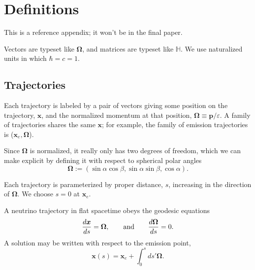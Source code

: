 \documentclass[aps,prd,twocolumn,superscriptaddress,groupedaddress]{revtex4}
\begin{document}
\appendix

\section{Definitions}

This is a reference appendix; it won't be in the final paper.

Vectors are typeset like $\bm{\Omega}$,
and matrices are typeset like $\mathbb{H}$.
We use naturalized units in which $\hbar=c=1$.

\subsection*{Trajectories}
\label{ssc:trajectories}
Each trajectory is labeled by a pair of vectors
giving some position on the trajectory, $\bm{x}$,
and the normalized momentum at that position,
$\bm{\Omega}\equiv\bm{p}/\varepsilon$.
A family of trajectories shares the same $\bm{x}$; for example,
the family of emission trajectories is ($\bm{x}_e,\bm{\Omega}$).

Since $\bm{\Omega}$ is normalized, it really only has two degrees of freedom,
which we can make explicit by defining it with respect to spherical polar
angles
\begin{equation}
  \label{eq:angle_def}
  \bm{\Omega} := (\sin\alpha\cos\beta,\sin\alpha\sin\beta,\cos\alpha).
\end{equation}

Each trajectory is parameterized by proper distance, $s$, increasing in
the direction of $\bm{\Omega}$. We choose $s=0$ at $\bm{x}_e$.

A neutrino trajectory in flat spacetime obeys the geodesic equations
\begin{align}
  \frac{d\bm{x}}{ds} = \bm{\Omega}, \qquad {\rm and} \qquad
  \frac{d\bm{\Omega}}{ds} = 0. \nonumber
\end{align}
A solution may be written with respect to the emission point,
\begin{equation}
  \label{eq:trajectory_x_solution_from_xe}
  \bm{x}(s) = \bm{x}_e + \int_{0}^{s}ds'\bm{\Omega}.
\end{equation}
\end{document}
